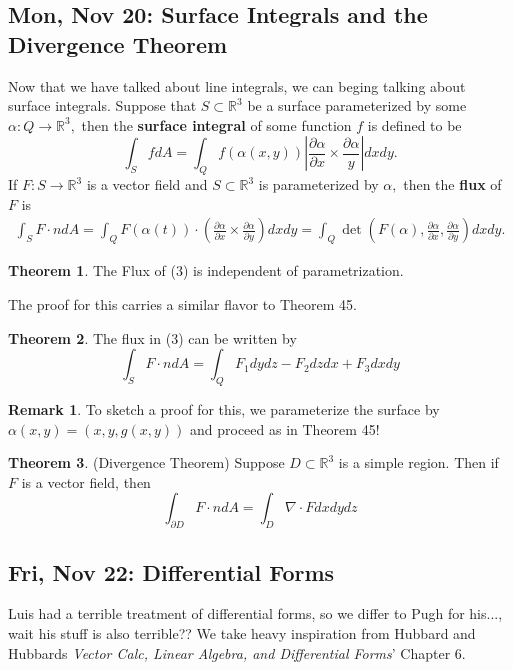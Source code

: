 \documentclass[10pt, oneside]{article}
\newcommand{\bbR}{\mathbb{R}}
\theoremstyle{definition}
\newtheorem{thm}{Theorem}
\newtheorem{rem}{Remark}
\begin{document}
\subsection{Mon, Nov 20: Surface Integrals and the Divergence Theorem}
Now that we have talked about line integrals, we can beging talking about surface integrals. Suppose that $S \subset \bbR^3$ be a surface parameterized by some $\alpha: Q \to \bbR^3,$ then the \textbf{surface integral} of some function $f$ is defined to be 
\[\int_S f dA = \int_Q f(\alpha(x,y)) \left| \frac{\partial \alpha}{\partial x}\times \frac{\partial \alpha}{y} \right|dxdy.\] If $F: S \to \bbR^3$ is a vector field and $S \subset \bbR^3$ is parameterized by $\alpha,$ then the \textbf{flux} of $F$ is 
\begin{align}
\int_S F \cdot n dA = \int_Q F(\alpha(t)) \cdot \left(\frac{\partial \alpha}{\partial x} \times \frac{\partial \alpha}{\partial y}\right)dxdy  = \int_Q \det(F(\alpha), \frac{\partial \alpha}{\partial x}, \frac{\partial \alpha}{\partial y})dxdy.
\end{align}    
\begin{thm}
    The Flux of (3) is independent of parametrization.
\end{thm}
The proof for this carries a similar flavor to Theorem 45.
\begin{thm}
    The flux in (3) can be written by 
    \[\int_S F\cdot n dA = \int_Q F_1dydz - F_2dzdx + F_3dxdy\]
\end{thm}
\begin{rem}
    To sketch a proof for this, we parameterize the surface by $\alpha(x,y) = (x,y,g(x,y))$ and proceed as in Theorem 45!
\end{rem}
\begin{thm}
    (Divergence Theorem) Suppose $D \subset \bbR^3$ is a simple region. Then if $F$ is a vector field, then 
    \[\int_{\partial D} F \cdot n dA = \int_D \nabla \cdot F dxdydz\]
\end{thm}




\newpage
\subsection{Fri, Nov 22: Differential Forms}
Luis had a terrible treatment of differential forms, so we differ to Pugh for his..., wait his stuff is also terrible?? We take heavy inspiration from Hubbard and Hubbards \textit{Vector Calc, Linear Algebra, and Differential Forms}' Chapter 6.
\end{document}
